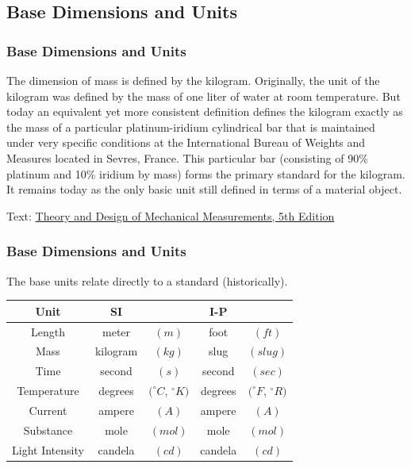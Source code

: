 \documentclass[fleqn]{beamer} %
\newcommand{\sectionIsubsectionIIItitle}{Base Dimensions and Units}
\begin{document}
		\subsection{\sectionIsubsectionIIItitle}\label{sectionIsubsectionIII}
			\begin{frame} 
				\frametitle{\sectionIsubsectionIIItitle}
				\bigskip

				The dimension of mass is defined by the kilogram. Originally, the unit of the kilogram was defined
by the mass of one liter of water at room temperature. But today an equivalent yet more consistent
definition defines the kilogram exactly as the mass of a particular platinum-iridium cylindrical bar
that is maintained under very specific conditions at the International Bureau of Weights and
Measures located in Sevres, France. This particular bar (consisting of 90\% platinum and 10\%
iridium by mass) forms the primary standard for the kilogram. It remains today as the only basic unit
still defined in terms of a material object.

{\tiny Text: \underline{Theory and Design of Mechanical Measurements, 5th Edition}}


			\end{frame}	

			\begin{frame}[containsverbatim] 
				\frametitle{\sectionIsubsectionIIItitle}

				The {\BL base units} relate directly to a standard (historically).\vspc

\renewcommand{\arraystretch}{1.2}
\begin{tabular}{|c|cc|cc|} \hline
\textbf{Unit}&\textbf{SI}&&\textbf{I-P}&\\ \hline\hline
Length&meter&$(m)$&foot&$(ft)$\\ \hline
Mass&kilogram&$(kg)$&slug&$(slug)$ \\\hline
Time&second&$(s)$&second&$(sec)$\\ \hline
Temperature&degrees&$(^\circ C$, $^\circ K)$&degrees&$(^\circ F$, $^\circ R)$ \\ \hline
Current&ampere&$(A)$&ampere&$(A)$\\ \hline
Substance&mole&$(mol)$&mole&$(mol)$\\ \hline
Light Intensity&candela&$(cd)$&candela&$(cd)$\\ \hline
\end{tabular}

				
			\end{frame}	
\end{document}
